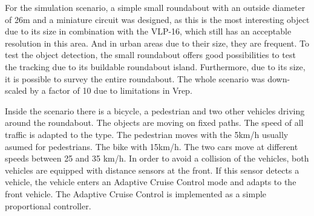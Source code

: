 \documentclass[11pt,oneside,openright]{mpreport}
\begin{document}
For the simulation scenario, a simple small roundabout with an outside diameter of 26m and a miniature circuit was designed,
as this is the most interesting object due to its size in combination with the VLP-16, which still has an acceptable resolution in this area.
And in urban areas due to their size, they are frequent. To test the object detection, the small roundabout offers good possibilities to test the tracking due to its buildable roundabout island.
Furthermore, due to its size, it is possible to survey the entire roundabout. The whole scenario was down-scaled by a factor of 10 due to limitations in Vrep.


Inside the scenario there is a bicycle, a pedestrian and two other vehicles driving around the roundabout. The objects are moving on fixed paths.
The speed of all traffic is adapted to the type. The pedestrian moves with the 5km/h usually asumed for pedestrians.
The bike with 15km/h. The two cars move at different speeds between 25 and 35 km/h. In order to avoid a collision of the vehicles,
both vehicles are equipped with distance sensors at the front. If this sensor detects a vehicle, the vehicle enters an Adaptive Cruise Control mode and adapts to the front vehicle.
The Adaptive Cruise Control is implemented as a simple proportional controller.

\end{document}
